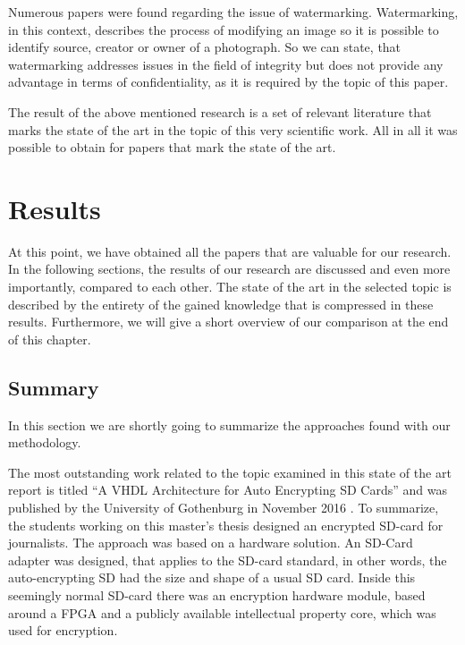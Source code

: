 \documentclass[12pt,a4paper,titlepage,oneside]{scrartcl}
\begin{document}
Numerous papers were found regarding the issue of watermarking.
Watermarking, in this context, describes the process of modifying an image so it is possible to identify source, creator or owner of a photograph.
So we can state, that watermarking addresses issues in the field of integrity but does not provide any advantage in terms of confidentiality, as it is required by the topic of this paper.

The result of the above mentioned research is a set of relevant literature that marks the state of the art in the topic of this very scientific work.
All in all it was possible to obtain for papers that mark the state of the art.

\newpage
\section{Results}
At this point, we have obtained all the papers that are valuable for our research.
In the following sections, the results of our research are discussed and even more importantly, compared to each other.
The state of the art in the selected topic is described by the entirety of the gained knowledge that is compressed in these results.
Furthermore, we will give a short overview of our comparison at the end of this chapter.

\subsection{Summary}
In this section we are shortly going to summarize the approaches found with our methodology.

The most outstanding work related to the topic examined in this state of the art report is titled ``A VHDL Architecture for Auto Encrypting SD Cards'' and was published by the University of Gothenburg in November 2016 \cite{Davidsson2016}.
To summarize, the students working on this master's thesis designed an encrypted SD-card for journalists.
The approach was based on a hardware solution.
An SD-Card adapter was designed, that applies to the SD-card standard, in other words, the auto-encrypting SD had the size and shape of a usual SD card.
Inside this seemingly normal SD-card there was an encryption hardware module, based around a FPGA and a publicly available intellectual property core, which was used for encryption.
\end{document}
